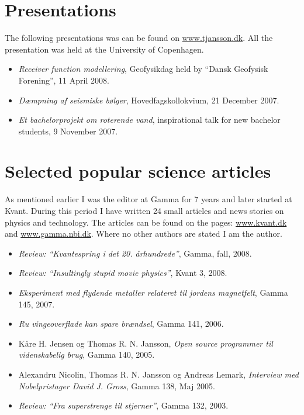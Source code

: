 \documentclass[margin,line,a4paper]{resume05}
\begin{document}
\begin{resume}
\section{ \mysidestyle Presentations}
The following presentations was can be found on \url{www.tjansson.dk}. All the
presentation was held at the University of Copenhagen. 
\begin{itemize}
    \item \emph{Receiver function modellering}, Geofysikdag held by ``Dansk
    Geofysisk Forening'',  11 April 2008. 
    \item \emph{Dæmpning af seismiske bølger}, Hovedfagskollokvium, 21 December
    2007. 
    \item \emph{Et bachelorprojekt om roterende vand}, inspirational talk for
    new bachelor students, 9 November 2007.
\end{itemize}

\section{\mysidestyle Selected popular science articles}
As mentioned earlier I was the editor at Gamma for 7 years and later started at
Kvant. During this period I have written 24 small articles and news stories on
physics and technology. The articles can be found on the pages:
\url{www.kvant.dk} and \url{www.gamma.nbi.dk}. Where no other authors are
stated I am the author.

\begin{itemize}
    \item \emph{Review: ``Kvantespring i det 20. århundrede''}, Gamma,
    fall, 2008.
    \item \emph{Review: ``Insultingly stupid movie physics''}, Kvant 3,
    2008.
    \item \emph{Eksperiment med flydende metaller relateret til jordens
    magnetfelt}, Gamma 145, 2007.
    \item \emph{Ru vingeoverflade kan spare brændsel}, Gamma 141, 2006.
    \item Kåre H. Jensen og Thomas R. N. Jansson, \emph{Open source programmer til
    videnskabelig brug}, Gamma 140, 2005.
    \item Alexandru Nicolin, Thomas R. N. Jansson og Andreas Lemark,
    \emph{Interview med Nobelpristager David J. Gross}, Gamma 138, Maj 2005.
    \item \emph{Review: ``Fra superstrenge til stjerner''},
    Gamma 132, 2003.
\end{itemize}


\end{resume}
\end{document}

